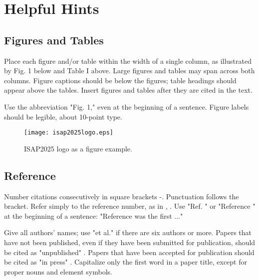 \documentclass[conference,a4paper]{isap2025}
\begin{document}

\section{Helpful Hints}


\subsection{Figures and Tables}

Place each figure and/or table within the width of a single column, as illustrated by Fig. 1 below and Table I above. Large figures and tables may span across both columns. Figure captions should be below the figures; table headings should appear above the tables. Insert figures and tables after they are cited in the text. 

Use the abbreviation "Fig. 1," even at the beginning of a sentence. Figure labels should be legible, about 10-point type.

\begin{figure}[htb]
\centering
\texttt{[image: isap2025logo.eps]}
\caption{ISAP2025 logo as a figure example.}
\label{fig1}
\end{figure}


\subsection{Reference}

Number citations consecutively in square brackets \cite{b1}-\cite{b5}. Punctuation follows the bracket. Refer simply to the reference number, as in \cite{b2}, \cite{b3}. Use "Ref. \cite{b4}" or "Reference \cite{b4}" at the beginning of a sentence: "Reference \cite{b4} was the first ..."

Give all authors' names; use "et al." if there are six authors or more. Papers that have not been published, even if they have been submitted for publication, should be cited as "unpublished" \cite{b6}. Papers that have been accepted for publication should be cited as "in press" \cite{b7}. Capitalize only the first word in a paper title, except for proper nouns and element symbols.
\end{document}
